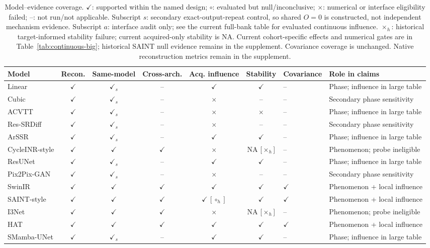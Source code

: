 \begin{table}[t]\centering\footnotesize
\caption{Model--evidence coverage. $\checkmark$: supported within the named design; $\circ$: evaluated but null/inconclusive; $\times$: numerical or interface eligibility failed; --: not run/not applicable. Subscript $s$: secondary exact-output-repeat control, so shared $O=0$ is constructed, not independent mechanism evidence. Subscript $a$: interface audit only; see the current full-bank table for evaluated continuous influence. $\times_h$: historical target-informed stability failure; current acquired-only stability is NA. Current cohort-specific effects and numerical gates are in Table~\ref{tab:continuous-big}; historical SAINT null evidence remains in the supplement. Covariance coverage is unchanged. Native reconstruction metrics remain in the supplement.}
\label{tab:coverage}\setlength{\tabcolsep}{3pt}
\begin{tabular}{lcccccll}\toprule
Model & Recon. & Same-model & Cross-arch. & Acq. influence & Stability & Covariance & Role in claims\\\midrule
Linear & $\checkmark$ & $\checkmark_s$ & -- & $\checkmark$ & $\checkmark$ & -- & Phase; influence in large table \\
Cubic & $\checkmark$ & $\checkmark_s$ & -- & $\times$ & -- & -- & Secondary phase sensitivity \\
ACVTT & $\checkmark$ & $\checkmark_s$ & -- & $\times$ & $\times$ & -- & Phase; influence in large table \\
Res-SRDiff & $\checkmark$ & $\checkmark_s$ & -- & $\times$ & -- & -- & Secondary phase sensitivity \\
ArSSR & $\checkmark$ & $\checkmark_s$ & -- & $\checkmark$ & $\checkmark$ & -- & Phase; influence in large table \\
CycleINR-style & $\checkmark$ & $\checkmark$ & $\checkmark$ & $\times$ & NA [$\times_h$] & -- & Phenomenon; probe ineligible \\
ResUNet & $\checkmark$ & $\checkmark_s$ & -- & $\checkmark$ & $\checkmark$ & -- & Phase; influence in large table \\
Pix2Pix-GAN & $\checkmark$ & $\checkmark_s$ & -- & $\times$ & -- & -- & Secondary phase sensitivity \\
SwinIR & $\checkmark$ & $\checkmark$ & $\checkmark$ & $\checkmark$ & $\checkmark$ & $\checkmark$ & Phenomenon + local influence \\
SAINT-style & $\checkmark$ & $\checkmark$ & $\checkmark$ & $\checkmark\,[\circ_h]$ & $\checkmark$ & $\checkmark$ & Phenomenon + local influence \\
I3Net & $\checkmark$ & $\checkmark$ & $\checkmark$ & $\times$ & NA [$\times_h$] & -- & Phenomenon; probe ineligible \\
HAT & $\checkmark$ & $\checkmark$ & $\checkmark$ & $\checkmark$ & $\checkmark$ & $\checkmark$ & Phenomenon + local influence \\
SMamba-UNet & $\checkmark$ & $\checkmark_s$ & -- & $\checkmark$ & $\checkmark$ & -- & Phase; influence in large table \\\bottomrule\end{tabular}\end{table}
